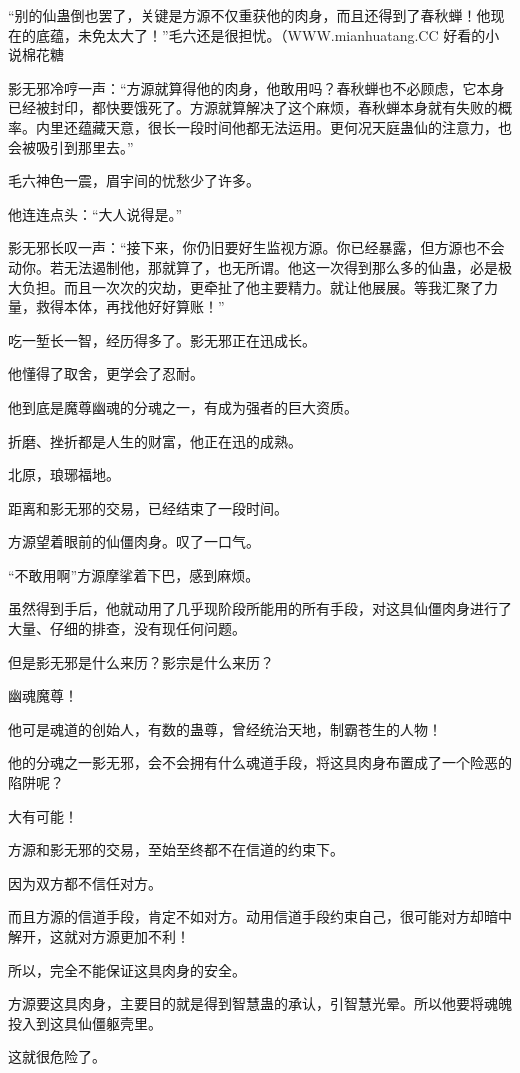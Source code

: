 \begin{this_body}
“别的仙蛊倒也罢了，关键是方源不仅重获他的肉身，而且还得到了春秋蝉！他现在的底蕴，未免太大了！”毛六还是很担忧。（WWW.mianhuatang.CC 好看的小说棉花糖

影无邪冷哼一声：“方源就算得他的肉身，他敢用吗？春秋蝉也不必顾虑，它本身已经被封印，都快要饿死了。方源就算解决了这个麻烦，春秋蝉本身就有失败的概率。内里还蕴藏天意，很长一段时间他都无法运用。更何况天庭蛊仙的注意力，也会被吸引到那里去。”

毛六神色一震，眉宇间的忧愁少了许多。

他连连点头：“大人说得是。”

影无邪长叹一声：“接下来，你仍旧要好生监视方源。你已经暴露，但方源也不会动你。若无法遏制他，那就算了，也无所谓。他这一次得到那么多的仙蛊，必是极大负担。而且一次次的灾劫，更牵扯了他主要精力。就让他展展。等我汇聚了力量，救得本体，再找他好好算账！”

吃一堑长一智，经历得多了。影无邪正在迅成长。

他懂得了取舍，更学会了忍耐。

他到底是魔尊幽魂的分魂之一，有成为强者的巨大资质。

折磨、挫折都是人生的财富，他正在迅的成熟。

北原，琅琊福地。

距离和影无邪的交易，已经结束了一段时间。

方源望着眼前的仙僵肉身。叹了一口气。

“不敢用啊”方源摩挲着下巴，感到麻烦。

虽然得到手后，他就动用了几乎现阶段所能用的所有手段，对这具仙僵肉身进行了大量、仔细的排查，没有现任何问题。

但是影无邪是什么来历？影宗是什么来历？

幽魂魔尊！

他可是魂道的创始人，有数的蛊尊，曾经统治天地，制霸苍生的人物！

他的分魂之一影无邪，会不会拥有什么魂道手段，将这具肉身布置成了一个险恶的陷阱呢？

大有可能！

方源和影无邪的交易，至始至终都不在信道的约束下。

因为双方都不信任对方。

而且方源的信道手段，肯定不如对方。动用信道手段约束自己，很可能对方却暗中解开，这就对方源更加不利！

所以，完全不能保证这具肉身的安全。

方源要这具肉身，主要目的就是得到智慧蛊的承认，引智慧光晕。所以他要将魂魄投入到这具仙僵躯壳里。

这就很危险了。


\end{this_body}
